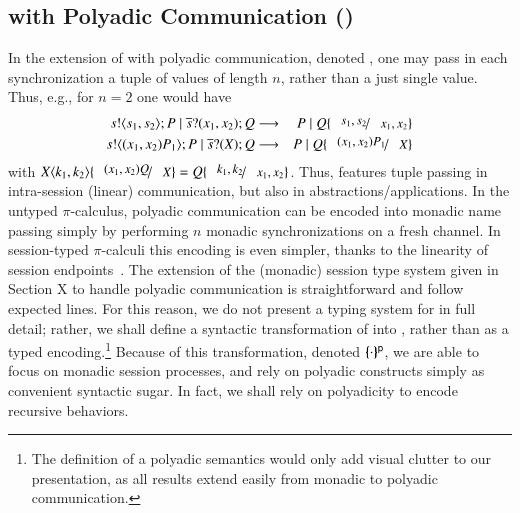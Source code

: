 %

\subsection{ \HOp with Polyadic Communication (\pHOp)}
In the extension of \HOp with 
polyadic
communication, denoted \pHOp, 
one may pass in each synchronization 
a tuple of values of length $n$, rather than a just single value.
Thus, e.g., for $n = 2$ one would have 
\begin{eqnarray*}
\bout{s}{s_1, s_2} P \Par \binp{\dual{s}}{x_1,x_2} Q  & \red &  P \Par Q \subst{s_1, s_2}{x_1,x_2} \\
\bout{s}{\abs{x_1, x_2}{P_1}} P \Par \binp{\dual{s}}{\X} Q & \red & P \Par Q \subst{\abs{x_1,x_2}{P_1}}{\X}
\end{eqnarray*}
with $\appl{X}{k_1,k_2} \subst{\abs{x_1,x_2}{Q}}{\X}  =  Q \subst{k_1,k_2}{x_1,x_2} $.
Thus, 
\pHOp features tuple passing in intra-session (linear) communication, but also in abstractions/applications. 
In the untyped $\pi$-calculus, polyadic communication can be encoded into monadic name passing 
simply by performing $n$ monadic synchronizations on a fresh channel. 
In session-typed $\pi$-calculi this encoding is even simpler, 
thanks to the linearity of session endpoints~\cite{VascoFun}.
The extension of the (monadic) session type system given in Section X to handle polyadic communication is straightforward and follow expected lines. For this reason, we do not present a typing system for \pHOp in full detail; rather, we shall define a syntactic transformation of \pHOp into \HOp, rather than as a typed encoding.\footnote{The definition of a polyadic semantics would only add visual clutter to our presentation, as all results extend easily from monadic to polyadic communication.}
Because of this transformation, denoted  $\{\!\!\{\cdot\}\!\!\}^\mathsf{p}$, we are able to focus on monadic session processes, and rely on polyadic constructs simply as convenient syntactic sugar. In fact, we shall rely on polyadicity to encode recursive behaviors.

